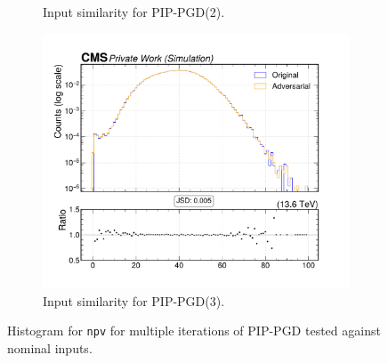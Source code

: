 \begin{figure}[htbp]
\begin{subfigure}[t]{0.32\textwidth}
    \caption*{Input similarity for PIP-PGD(2).}
  \end{subfigure}\hfill
  \begin{subfigure}[t]{0.32\textwidth}
    \includegraphics[width=\linewidth]{media/output/features/compare/combined_it_3/cmp_global_features_npv.pdf}
    \caption*{Input similarity for PIP-PGD(3).}
  \end{subfigure}

  \caption*{Histogram for \texttt{npv} for multiple iterations of PIP-PGD tested against nominal inputs.}
  \label{fig:combined_input_npv}
\end{figure}

